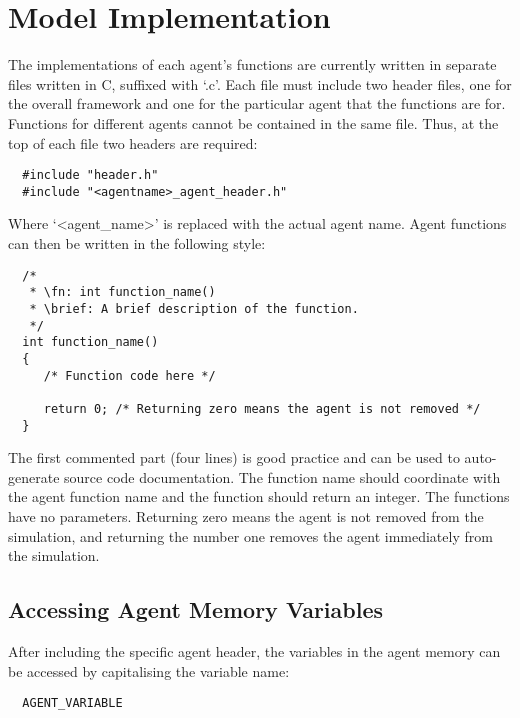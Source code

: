 \section{Model Implementation}
\label{sec:model_implementation}

The implementations of each agent's functions are currently written in separate
files written in C, suffixed with `.c'. Each file must include two
header files, one for the overall framework and one for the particular agent that the functions are for.
Functions for different agents cannot be contained in the same file.
Thus, at the top of each file two headers are required:

\begin{verbatim}
  #include "header.h"
  #include "<agentname>_agent_header.h"
\end{verbatim}

Where `<agent\_name>' is replaced with the actual agent name.
Agent functions can then be written in the following style:

\begin{verbatim}
  /*
   * \fn: int function_name()
   * \brief: A brief description of the function.
   */
  int function_name()
  {
     /* Function code here */
    
     return 0; /* Returning zero means the agent is not removed */
  }
\end{verbatim}

The first commented part (four lines) is good practice and can be used to
auto-generate source code documentation. The function name should coordinate
with the agent function name and the function should return an integer. The
functions have no parameters. Returning zero means the agent is not removed from
the simulation, and returning the number one removes the agent immediately from
the simulation.

\subsection{Accessing Agent Memory Variables}

After including the specific agent header, the variables in the
agent memory can be accessed by capitalising the variable name:

\begin{verbatim}
  AGENT_VARIABLE
\end{verbatim}

